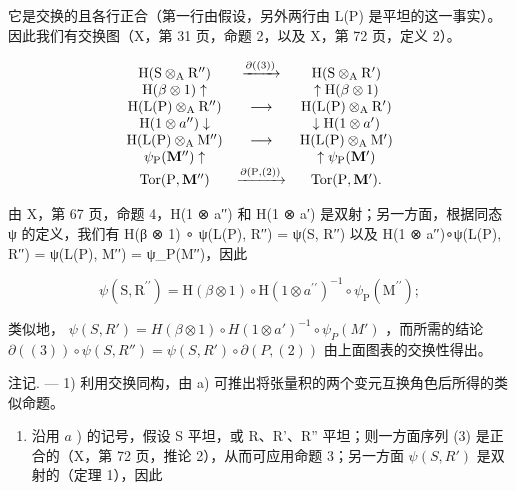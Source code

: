 它是交换的且各行正合（第一行由假设，另外两行由 L(P) 是平坦的这一事实）。因此我们有交换图（X，第 31 页，命题 2，以及 X，第 72 页，定义 2）。

\[
\begin{array}{c c c} \mathrm{H} (\mathrm{S} \otimes_ {\mathrm{A}} \mathrm{R} ^ {\prime \prime}) & \xrightarrow {\partial ((3))} & \mathrm{H} (\mathrm{S} \otimes_ {\mathrm{A}} \mathrm{R} ^ {\prime}) \\ \mathrm{H} (\beta \otimes 1) \uparrow & & \uparrow \mathrm{H} (\beta \otimes 1) \\ \mathrm{H} (\mathrm{L} (\mathrm{P}) \otimes_ {\mathrm{A}} \mathrm{R} ^ {\prime \prime}) & \longrightarrow & \mathrm{H} (\mathrm{L} (\mathrm{P}) \otimes_ {\mathrm{A}} \mathrm{R} ^ {\prime}) \\ \mathrm{H} (1 \otimes a ^ {\prime \prime}) \downarrow & & \downarrow \mathrm{H} (1 \otimes a ^ {\prime}) \\ \mathrm{H} (\mathrm{L} (\mathrm{P}) \otimes_ {\mathrm{A}} \mathrm{M} ^ {\prime \prime}) & \longrightarrow & \mathrm{H} (\mathrm{L} (\mathrm{P}) \otimes_ {\mathrm{A}} \mathrm{M} ^ {\prime}) \\ \psi_ {\mathrm{P}} (\mathbf {M} ^ {\prime \prime}) \uparrow & & \uparrow \psi_ {\mathrm{P}} (\mathbf {M} ^ {\prime}) \\ \operatorname{Tor} (\mathrm{P}, \mathbf {M} ^ {\prime \prime}) & \xrightarrow {\partial (\mathrm{P} , (2))} & \operatorname{Tor} (\mathrm{P}, \mathbf {M} ^ {\prime}). \end{array}
\]

由 X，第 67 页，命题 4，H(1 ⊗ a′′) 和 H(1 ⊗ a′) 是双射；另一方面，根据同态 ψ 的定义，我们有 H(β ⊗ 1) ∘ ψ(L(P), R′′) = ψ(S, R′′) 以及 H(1 ⊗ a′′)∘ψ(L(P), R′′) = ψ(L(P), M′′) = ψ\_P(M′′)，因此

\[
\psi (\mathrm{S}, \mathrm{R} ^ {\prime \prime}) = \mathrm{H} (\beta \otimes 1) \circ \mathrm{H} (1 \otimes a ^ {\prime \prime}) ^ {- 1} \circ \psi_ {\mathrm{P}} (\mathrm{M} ^ {\prime \prime});
\]

类似地， \(\psi(S, R') = H(\beta \otimes 1) \circ H(1 \otimes a')^{-1} \circ \psi_P(M')\) ，而所需的结论 \(\partial((3)) \circ \psi(S, R'') = \psi(S, R') \circ \partial(P, (2))\) 由上面图表的交换性得出。

注记. --- 1) 利用交换同构，由 a) 可推出将张量积的两个变元互换角色后所得的类似命题。

\begin{enumerate}
\def\labelenumi{\arabic{enumi})}
\setcounter{enumi}{1}
\tightlist
\item
  沿用 \(a\) ) 的记号，假设 S 平坦，或 R、R'、R'' 平坦；则一方面序列 (3) 是正合的（X，第 72 页，推论 2），从而可应用命题 3；另一方面 \(\psi(S, R')\) 是双射的（定理 1），因此
\end{enumerate}

